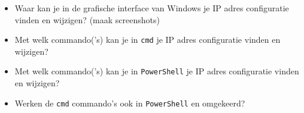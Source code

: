 \begin{itemize}
	\item Waar kan je in de grafische interface van Windows je IP adres configuratie vinden en wijzigen? (maak screenshots)
	\item Met welk commando('s) kan je in \texttt{cmd} je IP adres configuratie vinden en wijzigen?
	\item Met welk commando('s) kan je in \texttt{PowerShell} je IP adres configuratie vinden en wijzigen?
	\item Werken de  \texttt{cmd} commando's ook in \texttt{PowerShell} en omgekeerd?
\end{itemize}

